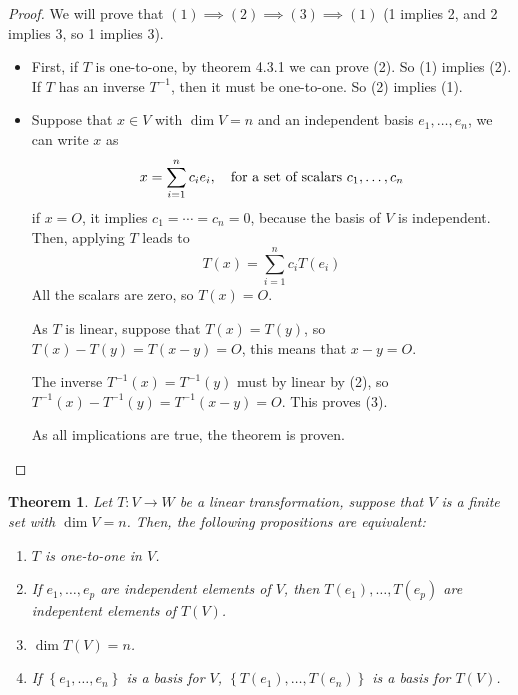 \documentclass{book}
\newtheorem{theorem}{Theorem}[section]
\begin{document}
\begin{proof}
    We will prove that $(1)\implies (2) \implies (3) \implies (1)$ (1 implies 2, and 2 implies 3, so 1 implies 3).

    \begin{itemize}
        \item First, if $T$ is one-to-one, by theorem 4.3.1 we can prove (2). So (1) implies
              (2). If $T$ has an inverse $T^{-1}$, then it must be one-to-one. So (2) implies
              (1).
        \item Suppose that $x\in V$ with $\dim V = n$ and an independent basis
              $e_1,\dots,e_n$, we can write $x$ as
              \begin{equation*}
                  x=\sum_{i=1}^{n}{c_i e_i}, \quad \textnormal{for a set of scalars }c_1,\dots,c_n
              \end{equation*}
              if $x=O$, it implies $c_1=\cdots=c_n=0$, because the basis of $V$ is independent. Then, applying $T$ leads to
              \begin{equation*}
                  T(x)=\sum_{i=1}^{n}{c_i T(e_i)}
              \end{equation*}
              All the scalars are zero, so $T(x) = O$.

              As $T$ is linear, suppose that $T(x) = T(y)$, so $T(x) - T(y)= T(x-y) = O$,
              this means that $x-y=O$.

              The inverse $T^{-1}(x) = T^{-1}(y)$ must by linear by (2), so $T^{-1}(x) -
                  T^{-1}(y) = T^{-1}(x-y)=O$. This proves (3).

              As all implications are true, the theorem is proven.
    \end{itemize}
\end{proof}

\begin{theorem}
    Let $T: V\to W$ be a linear transformation, suppose that $V$ is a finite set with $\dim V = n$.
    Then, the following propositions are equivalent:

    \begin{enumerate}
        \item $T$ is one-to-one in $V$.
        \item If $e_1,\dots,e_p$ are independent elements of $V$, then $T(e_1),\dots, T(e_p)$
              are indepentent elements of $T(V)$.
        \item $\dim T(V) = n$.
        \item If $\left\{e_1,\dots, e_n\right\}$ is a basis for $V$, $\left\{T(e_1),\dots,
                  T(e_n)\right\}$ is a basis for $T(V)$.
    \end{enumerate}

\end{theorem}
\end{document}
